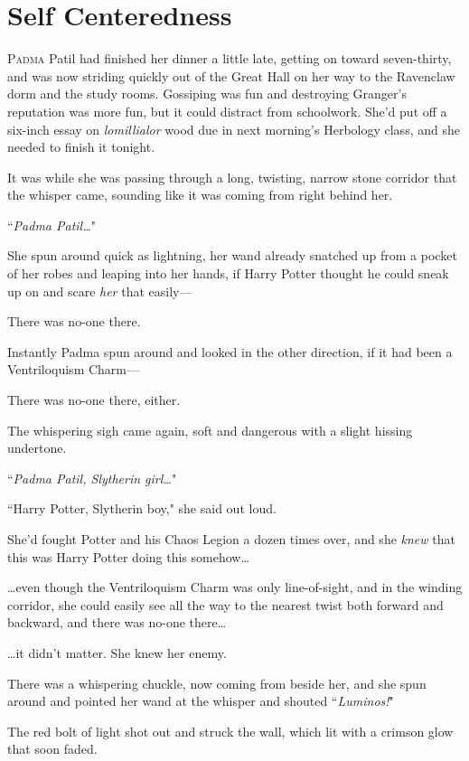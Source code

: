 \chapter{Self Centeredness}

\lettrine{P}{adma} Patil had finished her dinner a little late, getting on toward seven-thirty, and was now striding quickly out of the Great Hall on her way to the Ravenclaw dorm and the study rooms. Gossiping was fun and destroying Granger's reputation was more fun, but it could distract from schoolwork. She'd put off a six-inch essay on \emph{lomillialor} wood due in next morning's Herbology class, and she needed to finish it tonight.

It was while she was passing through a long, twisting, narrow stone corridor that the whisper came, sounding like it was coming from right behind her.

``\emph{Padma Patil{\ldots}}"

She spun around quick as lightning, her wand already snatched up from a pocket of her robes and leaping into her hands, if Harry Potter thought he could sneak up on and scare \emph{her} that easily—

There was no-one there.

Instantly Padma spun around and looked in the other direction, if it had been a Ventriloquism Charm—

There was no-one there, either.

The whispering sigh came again, soft and dangerous with a slight hissing undertone.

``\emph{Padma Patil, Slytherin girl{\ldots}}"

``Harry Potter, Slytherin boy," she said out loud.

She'd fought Potter and his Chaos Legion a dozen times over, and she \emph{knew} that this was Harry Potter doing this somehow{\ldots}

{\ldots}even though the Ventriloquism Charm was only line-of-sight, and in the winding corridor, she could easily see all the way to the nearest twist both forward and backward, and there was no-one there{\ldots}

{\ldots}it didn't matter. She knew her enemy.

There was a whispering chuckle, now coming from beside her, and she spun around and pointed her wand at the whisper and shouted ``\emph{Luminos!}"

The red bolt of light shot out and struck the wall, which lit with a crimson glow that soon faded.

